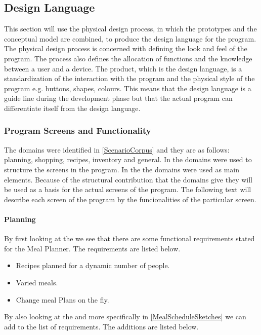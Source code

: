 \subsection{Design Language}
This section will use the physical design process, in which the prototypes and the conceptual model are combined, to produce the design language for the program. The physical design process is concerned with defining the look and feel of the program. The process also defines the allocation of functions and the knowledge between a user and a device. The product, which is the design language, is a standardization of the interaction with the program and the physical style of the program e.g. buttons, shapes, colours. This means that the design language is a guide line during the development phase but that the actual program can differentiate itself from the design language.

\subsubsection{Program Screens and Functionality} \label{ScreensandFunctionality}
The domains were identified in \cref{ScenarioCorpus} and they are as follows: planning, shopping, recipes, inventory and general. In  the domains were used to structure the screens in the program. In the  the domains were used as main elements. Because of the structural contribution that the domains give they will be used as a basis for the actual screens of the program. The following text will describe each screen of the program by the funcionalities of the particular screen.

\paragraph{Planning}
By first looking at the  we see that there are some functional requirements stated for the Meal Planner. The requirements are listed below.

\begin{itemize}
\item Recipes planned for a dynamic number of people.
\item Varied meals.
\item Change meal Plans on the fly.
\end{itemize}  

By also looking at the  and more specifically in \cref{MealScheduleSketches} we can add to the list of requirements. The additions are listed below.

